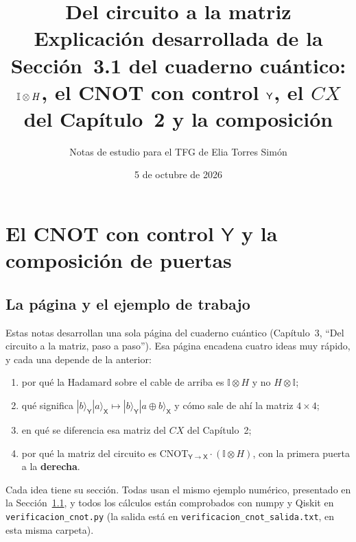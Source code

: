 \documentclass[11pt, a4paper, twoside, openright]{report}
\title{\color{rosa}\textbf{Del circuito a la matriz}\\[4pt]\large Explicación desarrollada de la Sección~3.1 del cuaderno cuántico:\\ $\I\otimes H$, el CNOT con control $\Y$, el $CX$ del Capítulo~2 y la composición}
\author{Notas de estudio para el TFG de Elia Torres Simón}
\date{5 de octubre de 2026}
\newenvironment{bloque}{\par\noindent\begin{minipage}{\linewidth}\setlength{\parskip}{4pt}}{\end{minipage}\par\medskip}
\providecommand{\ket}[1]{|#1\rangle}
\newcommand{\X}{\mathsf{X}}
\newcommand{\Y}{\mathsf{Y}}
\newcommand{\CYX}{\mathrm{CNOT}_{\Y\to\X}}
\newcommand{\I}{\mathbb{I}}
\begin{document}
\maketitle

\chapter{El CNOT con control $\Y$ y la composición de puertas}


\section{La página y el ejemplo de trabajo}\label{sec:pagina}

\begin{bloque}
Estas notas desarrollan una sola página del cuaderno cuántico (Capítulo~3, ``Del circuito a la matriz, paso a paso''). Esa página encadena cuatro ideas muy rápido, y cada una depende de la anterior:
\begin{enumerate}
  \item por qué la Hadamard sobre el cable de arriba es $\I\otimes H$ y no $H\otimes\I$;
  \item qué significa $\ket{b}_\Y\ket{a}_\X\mapsto\ket{b}_\Y\ket{a\oplus b}_\X$ y cómo sale de ahí la matriz $4\times4$;
  \item en qué se diferencia esa matriz del $CX$ del Capítulo~2;
  \item por qué la matriz del circuito es $\CYX\cdot(\I\otimes H)$, con la primera puerta a la \textbf{derecha}.
\end{enumerate}
Cada idea tiene su sección. Todas usan el mismo ejemplo numérico, presentado en la Sección~\ref{sec:pagina}, y todos los cálculos están comprobados con numpy y Qiskit en \texttt{verificacion\_cnot.py} (la salida está en \texttt{verificacion\_cnot\_salida.txt}, en esta misma carpeta).
\end{bloque}
\end{document}
